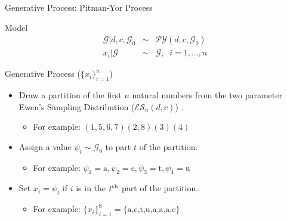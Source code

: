 \documentclass{beamer}
\newcommand{\G}{\mathcal{G}}
\newcommand{\PY}{\mathcal{P}\mathcal{Y}}
\newcommand{\ES}{\mathcal{E}\mathcal{S}}
\begin{document}
\begin{frame}[t]{Generative Process: Pitman-Yor Process}

	\begin{block}{Model}
		\vspace{-.5cm}
		\begin{eqnarray*}
			\G | d,c, \G_0 &\sim& \PY(d,c,\G_0) \\
			x_i | \G &\sim& \G, \;\; i=1,\ldots,n
		\end{eqnarray*}
	\end{block}

	\begin{block}{Generative Process ($\{ x_i \}_{i = 1}^n$)}
		\begin{itemize}
			\item Draw a partition of the first $n$ natural numbers from the two parameter Ewen's Sampling Distribution ($\ES_n(d,c)$) \cite{Ewens1995}.
				\begin{itemize}
					\item {\scriptsize For example: $(1,5,6,7)(2,8)(3)(4)$}
				\end{itemize}
			\item Assign a value $\psi_t \sim \G_0$ to part $t$ of the partition.
				\begin{itemize}
					\item {\scriptsize For example: $\psi_1 = \textrm{a}, \psi_2 = \textrm{c}, \psi_3 = \textrm{t}, \psi_4 = \textrm{u}$}
				\end{itemize}			
			\item Set $x_i = \psi_t$ if $i$ is in the $t^{\rm th}$ part of the partition.
				\begin{itemize}
					\item {\scriptsize For example: $ \{ x_i \}_{i = 1}^8 = \{ \textrm{a,c,t,u,a,a,a,c} \}$}
				\end{itemize}
		\end{itemize}
	\end{block}	
\end{frame}
\end{document}
